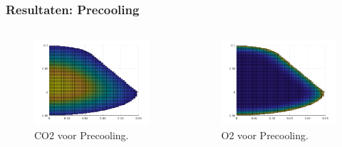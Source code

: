 \documentclass{beamer}
\begin{document}
\begin{frame}
\frametitle{Resultaten: Precooling}
\begin{columns}
\begin{column}{0.48\textwidth}
\begin{figure}
\includegraphics[width = 1\textwidth]{Precooling_pear_CO2_boven.png}
\caption{CO2 voor Precooling.}
\end{figure}
\end{column}
	
\begin{column}{0.48\textwidth}
\begin{figure}
\includegraphics[width = 1\textwidth]{Precooling_pear_O2_boven.png}
\caption{O2 voor Precooling.}
\end{figure}
\end{column}
\end{columns}
\end{frame}
\end{document}
